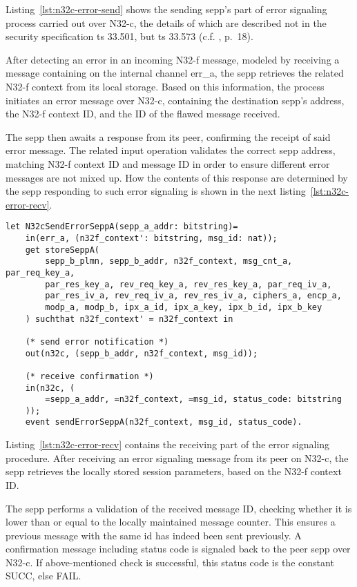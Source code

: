 Listing~\ref{lst:n32c-error-send} shows the sending \gls{sepp}'s part of error signaling process carried out over N32-c, the details of which are described not in the security specification \gls{ts} 33.501, but \gls{ts} 33.573 (c.f. \cite{3gpp.29.573}, p.~18).

After detecting an error in an incoming N32-f message, modeled by receiving a message containing on the internal channel {\sffamily err\_a}, the \gls{sepp} retrieves the related N32-f context from its local storage.
Based on this information, the process initiates an error message over N32-c, containing the destination \gls{sepp}'s address, the N32-f context ID, and the ID of the flawed message received.

The \gls{sepp} then awaits a response from its peer, confirming the receipt of said error message.
The related input operation validates the correct \gls{sepp} address, matching N32-f context ID and message ID in order to ensure different error messages are not mixed up.
How the contents of this response are determined by the \gls{sepp} responding to such error signaling is shown in the next listing~\ref{lst:n32c-error-recv}.

\begin{lstlisting}[caption={Definition of the sending error signaling process},label={lst:n32c-error-send},firstnumber=555]
let N32cSendErrorSeppA(sepp_a_addr: bitstring)=
    in(err_a, (n32f_context': bitstring, msg_id: nat));
    get storeSeppA(
        sepp_b_plmn, sepp_b_addr, n32f_context, msg_cnt_a, par_req_key_a,
        par_res_key_a, rev_req_key_a, rev_res_key_a, par_req_iv_a,
        par_res_iv_a, rev_req_iv_a, rev_res_iv_a, ciphers_a, encp_a,
        modp_a, modp_b, ipx_a_id, ipx_a_key, ipx_b_id, ipx_b_key
    ) suchthat n32f_context' = n32f_context in

    (* send error notification *)
    out(n32c, (sepp_b_addr, n32f_context, msg_id));

    (* receive confirmation *)
    in(n32c, (
        =sepp_a_addr, =n32f_context, =msg_id, status_code: bitstring
    ));
    event sendErrorSeppA(n32f_context, msg_id, status_code).
\end{lstlisting}

Listing~\ref{lst:n32c-error-recv} contains the receiving part of the error signaling procedure.
After receiving an error signaling message from its peer on N32-c, the \gls{sepp} retrieves the locally stored session parameters, based on the N32-f context ID.

The \gls{sepp} performs a validation of the received message ID, checking whether it is lower than or equal to the locally maintained message counter.
This ensures a previous message with the same id has indeed been sent previously.
A confirmation message including status code is signaled back to the peer \gls{sepp} over N32-c.
If above-mentioned check is successful, this status code is the constant {\sffamily SUCC}, else {\sffamily FAIL}.

